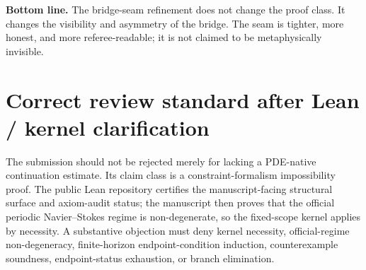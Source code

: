 \documentclass[11pt,letterpaper]{article}
\begin{document}
\begin{scopebox}
\textbf{Bottom line.} The bridge-seam refinement does not change the proof class. It changes the visibility and asymmetry of the bridge. The seam is tighter, more honest, and more referee-readable; it is not claimed to be metaphysically invisible.
\end{scopebox}


\section*{Correct review standard after Lean / kernel clarification}
The submission should not be rejected merely for lacking a PDE-native continuation estimate. Its claim class is a constraint-formalism impossibility proof. The public Lean repository certifies the manuscript-facing structural surface and axiom-audit status; the manuscript then proves that the official periodic Navier--Stokes regime is non-degenerate, so the fixed-scope kernel applies by necessity. A substantive objection must deny kernel necessity, official-regime non-degeneracy, finite-horizon endpoint-condition induction, counterexample soundness, endpoint-status exhaustion, or branch elimination.
\end{document}
